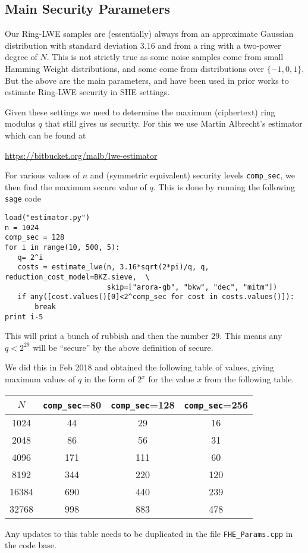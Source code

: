 \subsection{Main Security Parameters}
Our Ring-LWE samples are (essentially) always from an
approximate Gaussian distribution with standard deviation $3.16$
and from a ring with a two-power degree of $N$.
This is not strictly true as some noise samples come
from small Hamming Weight distributions, and some come
from distributions over $\{-1,0,1\}$. 
But the above are the main parameters, and have been used in prior works to
estimate Ring-LWE security in SHE settings.

Given these settings we need to determine the maximum 
(ciphertext) ring modulus $q$ that still gives us security.
For this we use Martin Albrecht's estimator which can
be found at
\begin{center}
\url{https://bitbucket.org/malb/lwe-estimator}
\end{center}
For various values of $n$ and (symmetric equivalent)
security levels \verb+comp_sec+, we then find the maximum secure
value of $q$.
This is done by running the following \verb+sage+ code
\begin{verbatim}
load("estimator.py")
n = 1024
comp_sec = 128
for i in range(10, 500, 5):
   q= 2^i
   costs = estimate_lwe(n, 3.16*sqrt(2*pi)/q, q, reduction_cost_model=BKZ.sieve,  \
                        skip=["arora-gb", "bkw", "dec", "mitm"])
   if any([cost.values()[0]<2^comp_sec for cost in costs.values()]):
       break
print i-5
\end{verbatim}
This will print a bunch of rubbish and then the number $29$. 
This means any $q < 2^{29}$ will be ``secure'' by the above definition of secure.

We did this in Feb 2018 and obtained the following table of values, giving maximum
values of $q$ in the form of $2^x$ for the value $x$ from the following table.
\begin{center}
\begin{tabular}{|c|c|c|c|}
\hline
$N$   & \verb+comp_sec+=80 & \verb+comp_sec+=128 & \verb+comp_sec+=256 \\
\hline
1024  &  44 &    29        & 16 \\
2048  &  86 &    56        & 31 \\
4096  & 171 &   111        & 60 \\
8192  & 344 &   220        & 120 \\
16384 & 690 &   440        & 239 \\
32768 & 998 &   883        & 478 \\
\hline
\end{tabular}
\end{center}
Any updates to this table needs to be duplicated in 
the file \verb+FHE_Params.cpp+ in the code base.

